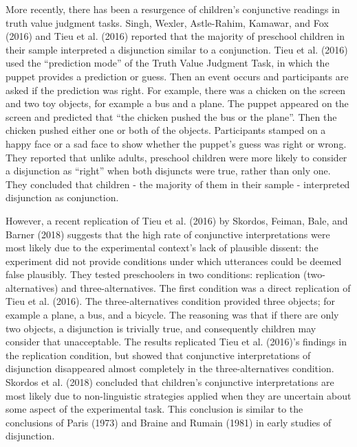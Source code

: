 \documentclass[floatsintext,man]{apa6}
\theoremstyle{definition}
\theoremstyle{definition}
\theoremstyle{definition}
\theoremstyle{remark}
\begin{document}
More recently, there has been a resurgence of children's conjunctive
readings in truth value judgment tasks. Singh, Wexler, Astle-Rahim,
Kamawar, and Fox (2016) and Tieu et al. (2016) reported that the
majority of preschool children in their sample interpreted a disjunction
similar to a conjunction. Tieu et al. (2016) used the
\enquote{prediction mode} of the Truth Value Judgment Task, in which the
puppet provides a prediction or guess. Then an event occurs and
participants are asked if the prediction was right. For example, there
was a chicken on the screen and two toy objects, for example a bus and a
plane. The puppet appeared on the screen and predicted that \enquote{the
chicken pushed the bus or the plane}. Then the chicken pushed either one
or both of the objects. Participants stamped on a happy face or a sad
face to show whether the puppet's guess was right or wrong. They
reported that unlike adults, preschool children were more likely to
consider a disjunction as \enquote{right} when both disjuncts were true,
rather than only one. They concluded that children - the majority of
them in their sample - interpreted disjunction as conjunction.

However, a recent replication of Tieu et al. (2016) by Skordos, Feiman,
Bale, and Barner (2018) suggests that the high rate of conjunctive
interpretations were most likely due to the experimental context's lack
of plausible dissent: the experiment did not provide conditions under
which utterances could be deemed false plausibly. They tested
preschoolers in two conditions: replication (two-alternatives) and
three-alternatives. The first condition was a direct replication of Tieu
et al. (2016). The three-alternatives condition provided three objects;
for example a plane, a bus, and a bicycle. The reasoning was that if
there are only two objects, a disjunction is trivially true, and
consequently children may consider that unacceptable. The results
replicated Tieu et al. (2016)'s findings in the replication condition,
but showed that conjunctive interpretations of disjunction disappeared
almost completely in the three-alternatives condition. Skordos et al.
(2018) concluded that children's conjunctive interpretations are most
likely due to non-linguistic strategies applied when they are uncertain
about some aspect of the experimental task. This conclusion is similar
to the conclusions of Paris (1973) and Braine and Rumain (1981) in early
studies of disjunction.
\end{document}
